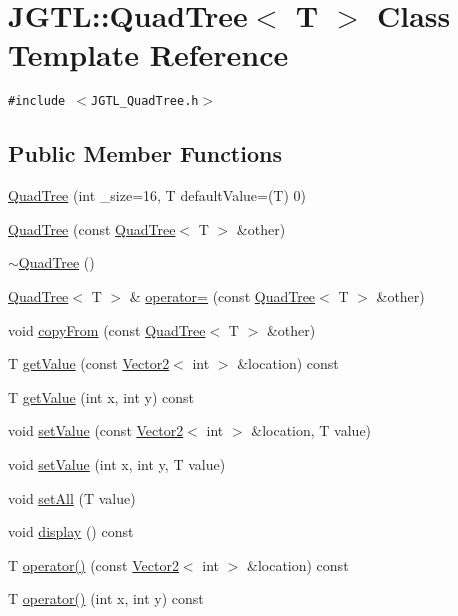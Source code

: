 \hypertarget{class_j_g_t_l_1_1_quad_tree}{
\section{JGTL::Quad\-Tree$<$ T $>$ Class Template Reference}
\label{class_j_g_t_l_1_1_quad_tree}
}
{\tt \#include $<$JGTL\_\-Quad\-Tree.h$>$}

\subsection*{Public Member Functions}
\begin{CompactItemize}
\item 
\hyperlink{class_j_g_t_l_1_1_quad_tree_c256396553c64aa8de31ca662f50aa66}{Quad\-Tree} (int \_\-size=16, T default\-Value=(T) 0)
\item 
\hyperlink{class_j_g_t_l_1_1_quad_tree_fbc1b07fcbfd69920d2502b6db795dad}{Quad\-Tree} (const \hyperlink{class_j_g_t_l_1_1_quad_tree}{Quad\-Tree}$<$ T $>$ \&other)
\item 
\hyperlink{class_j_g_t_l_1_1_quad_tree_ea1ebe6c609f4cdd7f78d9d099d7b6a6}{$\sim$Quad\-Tree} ()
\item 
\hyperlink{class_j_g_t_l_1_1_quad_tree}{Quad\-Tree}$<$ T $>$ \& \hyperlink{class_j_g_t_l_1_1_quad_tree_bdd26472812c1f1c5889a56a3f7f218d}{operator=} (const \hyperlink{class_j_g_t_l_1_1_quad_tree}{Quad\-Tree}$<$ T $>$ \&other)
\item 
void \hyperlink{class_j_g_t_l_1_1_quad_tree_faeac9070d0e994db181ce2e7b08bba2}{copy\-From} (const \hyperlink{class_j_g_t_l_1_1_quad_tree}{Quad\-Tree}$<$ T $>$ \&other)
\item 
T \hyperlink{class_j_g_t_l_1_1_quad_tree_862ebd81b3404cbf8e79098e6562e9df}{get\-Value} (const \hyperlink{class_j_g_t_l_1_1_vector2}{Vector2}$<$ int $>$ \&location) const
\item 
T \hyperlink{class_j_g_t_l_1_1_quad_tree_0bbb593bc2e26939a5149008391d8a7f}{get\-Value} (int x, int y) const
\item 
void \hyperlink{class_j_g_t_l_1_1_quad_tree_a209ae18d1b045e6ca3264bc9498b9ed}{set\-Value} (const \hyperlink{class_j_g_t_l_1_1_vector2}{Vector2}$<$ int $>$ \&location, T value)
\item 
void \hyperlink{class_j_g_t_l_1_1_quad_tree_04258020bf56d8828dc85e7dfa1fce71}{set\-Value} (int x, int y, T value)
\item 
void \hyperlink{class_j_g_t_l_1_1_quad_tree_f2a38bf1f48a331b81050d3fd04f843c}{set\-All} (T value)
\item 
void \hyperlink{class_j_g_t_l_1_1_quad_tree_ec3b9217d164d507156f6f39f440e712}{display} () const
\item 
T \hyperlink{class_j_g_t_l_1_1_quad_tree_bf12879db39752804ea0350603bfb7e3}{operator()} (const \hyperlink{class_j_g_t_l_1_1_vector2}{Vector2}$<$ int $>$ \&location) const
\item 
T \hyperlink{class_j_g_t_l_1_1_quad_tree_483b4a644c46b742bb7e77b32b6dc71b}{operator()} (int x, int y) const
\end{CompactItemize}

